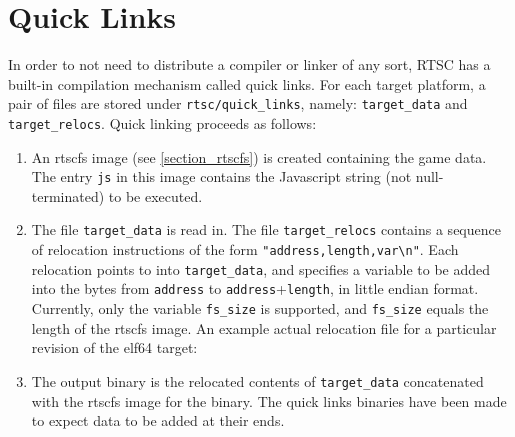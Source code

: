 \documentclass[10pt]{book}
\begin{document}
\section{Quick Links}
\label{section_quick_links}
In order to not need to distribute a compiler or linker of any sort, RTSC has a built-in compilation mechanism called quick links.
For each target platform, a pair of files are stored under \texttt{rtsc/quick\_links}, namely: \texttt{target\_data} and \texttt{target\_relocs}.
Quick linking proceeds as follows:
\begin{enumerate}
\item
An rtscfs image (see \ref{section_rtscfs}) is created containing the game data.
The entry \texttt{js} in this image contains the Javascript string (not null-terminated) to be executed.
\item
The file \texttt{target\_data} is read in.
The file \texttt{target\_relocs} contains a sequence of relocation instructions of the form \texttt{"address,length,var\textbackslash n"}.
Each relocation points to into \texttt{target\_data}, and specifies a variable to be added into the bytes from \texttt{address} to \texttt{address}+\texttt{length}, in little endian format.
Currently, only the variable \texttt{fs\_size} is supported, and \texttt{fs\_size} equals the length of the rtscfs image.
An example actual relocation file for a particular revision of the elf64 target:

\item
The output binary is the relocated contents of \texttt{target\_data} concatenated with the rtscfs image for the binary.
The quick links binaries have been made to expect data to be added at their ends.
\end{enumerate}
\end{document}
